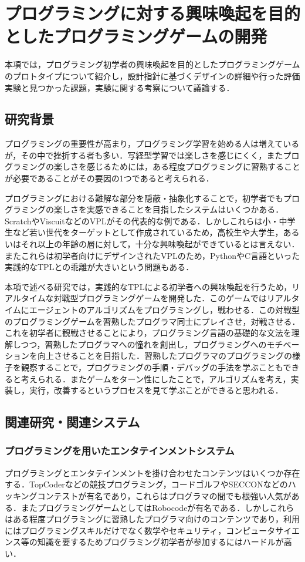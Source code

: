 \section{プログラミングに対する興味喚起を目的としたプログラミングゲームの開発}
本項では，プログラミング初学者の興味喚起を目的としたプログラミングゲームのプロトタイプについて紹介し，設計指針に基づくデザインの詳細や行った評価実験と見つかった課題，実験に関する考察について議論する．

\subsection{研究背景}
プログラミングの重要性が高まり，プログラミング学習を始める人は増えているが，その中で挫折する者も多い．写経型学習では楽しさを感じにくく，またプログラミングの楽しさを感じるためには，ある程度プログラミングに習熟することが必要であることがその要因の1つであると考えられる．

プログラミングにおける難解な部分を隠蔽・抽象化することで，初学者でもプログラミングの楽しさを実感できることを目指したシステムはいくつかある．ScratchやViscuitなどのVPLがその代表的な例である．しかしこれらは小・中学生など若い世代をターゲットとして作成されているため，高校生や大学生，あるいはそれ以上の年齢の層に対して，十分な興味喚起ができているとは言えない．またこれらは初学者向けにデザインされたVPLのため，PythonやC言語といった実践的なTPLとの乖離が大きいという問題もある．

本項で述べる研究では，実践的なTPLによる初学者への興味喚起を行うため，リアルタイムな対戦型プログラミングゲームを開発した．このゲームではリアルタイムにエージェントのアルゴリズムをプログラミングし，戦わせる．この対戦型のプログラミングゲームを習熟したプログラマ同士にプレイさせ，対戦させる．これを初学者に観戦させることにより，プログラミング言語の基礎的な文法を理解しつつ，習熟したプログラマへの憧れを創出し，プログラミングへのモチベーションを向上させることを目指した．習熟したプログラマのプログラミングの様子を観察することで，プログラミングの手順・デバッグの手法を学ぶこともできると考えられる．またゲームをターン性にしたことで，アルゴリズムを考え，実装し，実行，改善するというプロセスを見て学ぶことができると思われる．


\subsection{関連研究・関連システム}

\subsubsection{プログラミングを用いたエンタテインメントシステム}
プログラミングとエンタテインメントを掛け合わせたコンテンツはいくつか存在する．TopCoder\cite{topcoder}などの競技プログラミング，コードゴルフ\cite{codegolf}やSECCON\cite{seccon}などのハッキングコンテストが有名であり，これらはプログラマの間でも根強い人気がある．またプログラミングゲームとしてはRobocode\cite{robocode}が有名である．しかしこれらはある程度プログラミングに習熟したプログラマ向けのコンテンツであり，利用にはプログラミングスキルだけでなく数学やセキュリティ，コンピュータサイエンス等の知識を要するためプログラミング初学者が参加するにはハードルが高い．

